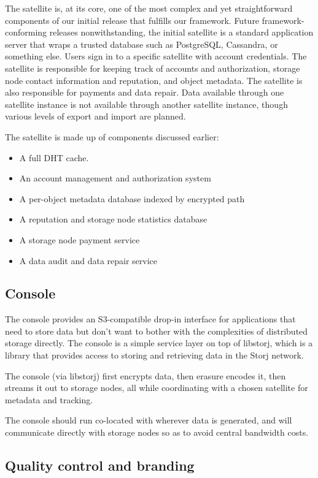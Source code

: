 \documentclass[a4paper,10pt]{article} \usepackage[utf8]{inputenc}
\begin{document}
The satellite is, at its core, one of the most complex and yet
straightforward components of our initial release that fulfills our framework.
Future framework-conforming releases nonwithstanding, the initial satellite
is a standard application server that wraps a trusted database such as
PostgreSQL, Cassandra, or something else. Users sign in to a specific
satellite with account credentials. The satellite is responsible for
keeping track of accounts and authorization, storage node contact information 
and
reputation, and object metadata. The satellite is also responsible for
payments and data repair. Data available through one satellite instance is
not available through another satellite instance, though various levels of
export and import are planned.

The satellite is made up of components discussed earlier:

\begin{itemize}
\item A full DHT cache.
\item An account management and authorization system
\item A per-object metadata database indexed by encrypted path
\item A reputation and storage node statistics database
\item A storage node payment service
\item A data audit and data repair service
\end{itemize}

\subsection{Console}

The console provides an S3-compatible drop-in interface for applications that
need to store data but don't want to bother with the complexities of distributed
storage directly. The console is a simple service layer on top of libstorj,
which is a library that provides access to storing and retrieving data in the
Storj network.

The console (via libstorj) first encrypts data, then erasure encodes it, then
streams it out to storage nodes, all while coordinating with a chosen satellite
for metadata and tracking.

The console should run co-located with wherever data is generated, and will
communicate directly with storage nodes so as to avoid central bandwidth costs.

\subsection{Quality control and branding}
\end{document}
